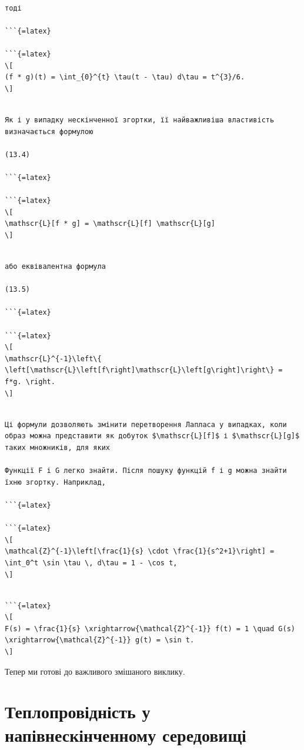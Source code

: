 \documentclass[
]{article}
\begin{document}
\begin{verbatim}

тоді

```{=latex}

```{=latex}
\[
(f * g)(t) = \int_{0}^{t} \tau(t - \tau) d\tau = t^{3}/6.
\]
\end{verbatim}

\begin{verbatim}

Як і у випадку нескінченної згортки, її найважливіша властивість визначається формулою

(13.4)

```{=latex}

```{=latex}
\[
\mathscr{L}[f * g] = \mathscr{L}[f] \mathscr{L}[g]
\]
\end{verbatim}

\begin{verbatim}

або еквівалентна формула

(13.5)

```{=latex}

```{=latex}
\[
\mathscr{L}^{-1}\left\{ \left[\mathscr{L}\left[f\right]\mathscr{L}\left[g\right]\right\} = f*g. \right.
\]
\end{verbatim}

\begin{verbatim}

Ці формули дозволяють змінити перетворення Лапласа у випадках, коли образ можна представити як добуток $\mathscr{L}[f]$ і $\mathscr{L}[g]$ таких множників, для яких

Функції F і G легко знайти. Після пошуку функцій f і g можна знайти їхню згортку. Наприклад,

```{=latex}

```{=latex}
\[
\mathcal{Z}^{-1}\left[\frac{1}{s} \cdot \frac{1}{s^2+1}\right] = \int_0^t \sin \tau \, d\tau = 1 - \cos t,
\]
\end{verbatim}

\begin{verbatim}

```{=latex}
\[
F(s) = \frac{1}{s} \xrightarrow{\mathcal{Z}^{-1}} f(t) = 1 \quad G(s) \xrightarrow{\mathcal{Z}^{-1}} g(t) = \sin t.
\]
\end{verbatim}

Тепер ми готові до важливого змішаного виклику.

\section{Теплопровідність у напівнескінченному
середовищі}\label{ux442ux435ux43fux43bux43eux43fux440ux43eux432ux456ux434ux43dux456ux441ux442ux44c-ux443-ux43dux430ux43fux456ux432ux43dux435ux441ux43aux456ux43dux447ux435ux43dux43dux43eux43cux443-ux441ux435ux440ux435ux434ux43eux432ux438ux449ux456}
\end{document}
